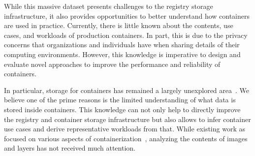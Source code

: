 While this massive dataset presents challenges to the registry storage
infrastructure, it also provides opportunities to better understand how
containers are used in practice.
%
Currently, there is little known about the contents, use cases, and workloads
of production containers.
%
In part, this is due to the privacy concerns that organizations and individuals
have when sharing details of their computing environments.
%
However, this knowledge is imperative to design and evaluate novel approaches
to improve the performance and reliability of containers.




In particular, storage for containers has remained a largely unexplored
area~\cite{login-container-storage-options}.
%
We believe one of the prime reasons is the limited understanding of what data
is stored inside containers.
%
This knowledge can not only help to directly improve the registry and container
storage infrastructure but also allows to infer container use cases and derive
representative workloads from that.
%
While existing work as focused on various aspects of
containerization~\cite{prev-work-1, prev-work-2, prev-work-3}, analyzing the
contents of images and layers has not received much attention.




%
%
%


%





